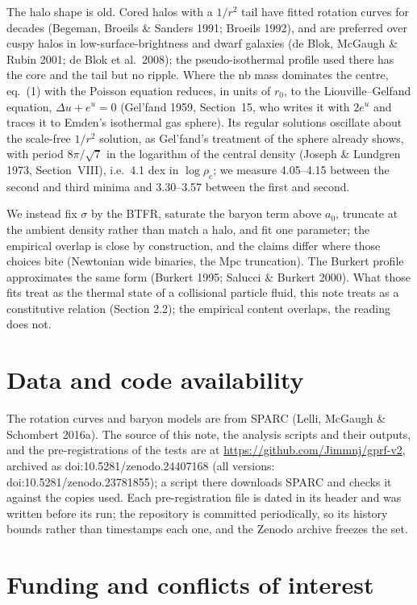 \documentclass[
  10pt,
]{article}
\begin{document}
The halo shape is old. Cored halos with a $1/r^2$ tail have fitted rotation curves for decades (Begeman, Broeils \& Sanders 1991; Broeils 1992), and are preferred over cuspy halos in low-surface-brightness and dwarf galaxies (de Blok, McGaugh \& Rubin 2001; de Blok et al.~2008); the pseudo-isothermal profile used there has the core and the tail but no ripple. Where the nb mass dominates the centre, eq.~(1) with the Poisson equation reduces, in units of $r_0$, to the Liouville--Gelfand equation, $\Delta u+e^u=0$ (Gel'fand 1959, Section~15, who writes it with $2e^u$ and traces it to Emden's isothermal gas sphere). Its regular solutions oscillate about the scale-free $1/r^2$ solution, as Gel'fand's treatment of the sphere already shows, with period $8\pi/\sqrt{7}$ in the logarithm of the central density (Joseph \& Lundgren 1973, Section~VIII), i.e.\ 4.1 dex in $\log\rho_c$; we measure 4.05--4.15 between the second and third minima and 3.30--3.57 between the first and second.

We instead fix $\sigma$ by the BTFR, saturate the baryon term above $a_0$, truncate at the ambient density rather than match a halo, and fit one parameter; the empirical overlap is close by construction, and the claims differ where those choices bite (Newtonian wide binaries, the Mpc truncation). The Burkert profile approximates the same form (Burkert 1995; Salucci \& Burkert 2000). What those fits treat as the thermal state of a collisional particle fluid, this note treats as a constitutive relation (Section 2.2); the empirical content overlaps, the reading does not.

\section{Data and code availability}\label{data-code}

The rotation curves and baryon models are from SPARC (Lelli, McGaugh \& Schombert 2016a). The source of this note, the analysis scripts and their outputs, and the pre-registrations of the tests are at \url{https://github.com/Jimmnj/gprf-v2}, archived as doi:10.5281/zenodo.24407168 (all versions: doi:10.5281/zenodo.23781855); a script there downloads SPARC and checks it against the copies used. Each pre-registration file is dated in its header and was written before its run; the repository is committed periodically, so its history bounds rather than timestamps each one, and the Zenodo archive freezes the set.

\section{Funding and conflicts of interest}
\end{document}
